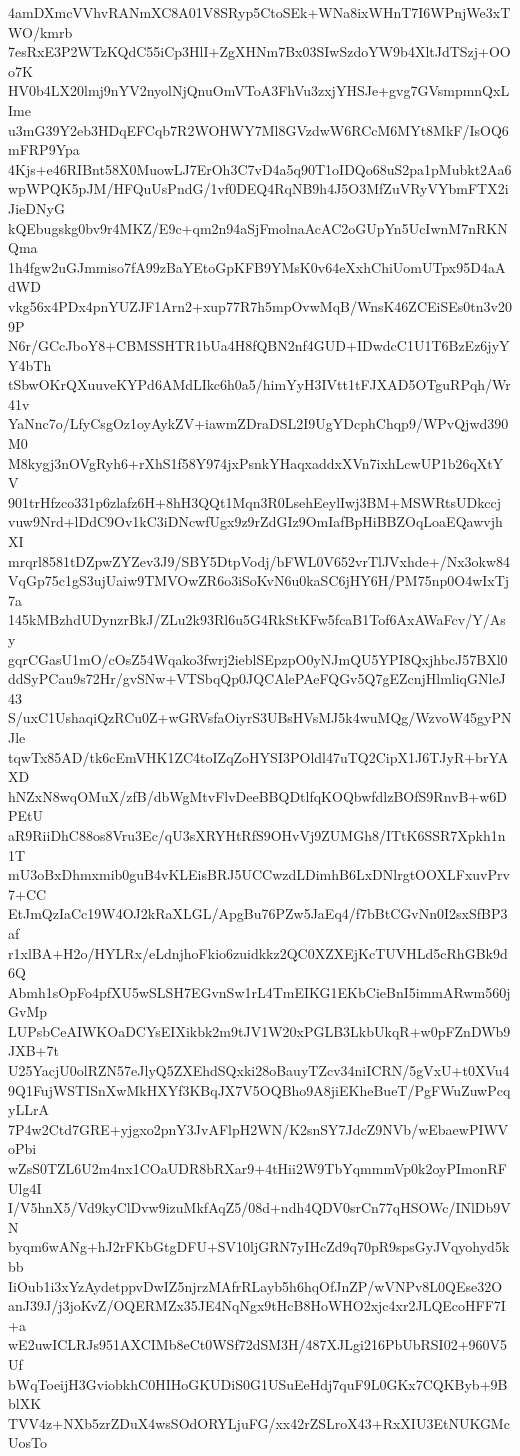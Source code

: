 4amDXmcVVhvRANmXC8A01V8SRyp5CtoSEk+WNa8ixWHnT7I6WPnjWe3xTWO/kmrb
7esRxE3P2WTzKQdC55iCp3HlI+ZgXHNm7Bx03SIwSzdoYW9b4XltJdTSzj+OOo7K
HV0b4LX20lmj9nYV2nyolNjQnuOmVToA3FhVu3zxjYHSJe+gvg7GVsmpmnQxLIme
u3mG39Y2eb3HDqEFCqb7R2WOHWY7Ml8GVzdwW6RCcM6MYt8MkF/IsOQ6mFRP9Ypa
4Kjs+e46RIBnt58X0MuowLJ7ErOh3C7vD4a5q90T1oIDQo68uS2pa1pMubkt2Aa6
wpWPQK5pJM/HFQuUsPndG/1vf0DEQ4RqNB9h4J5O3MfZuVRyVYbmFTX2iJieDNyG
kQEbugskg0bv9r4MKZ/E9c+qm2n94aSjFmolnaAcAC2oGUpYn5UcIwnM7nRKNQma
1h4fgw2uGJmmiso7fA99zBaYEtoGpKFB9YMsK0v64eXxhChiUomUTpx95D4aAdWD
vkg56x4PDx4pnYUZJF1Arn2+xup77R7h5mpOvwMqB/WnsK46ZCEiSEs0tn3v209P
N6r/GCcJboY8+CBMSSHTR1bUa4H8fQBN2nf4GUD+IDwdcC1U1T6BzEz6jyYY4bTh
tSbwOKrQXuuveKYPd6AMdLIkc6h0a5/himYyH3IVtt1tFJXAD5OTguRPqh/Wr41v
YaNnc7o/LfyCsgOz1oyAykZV+iawmZDraDSL2I9UgYDcphChqp9/WPvQjwd390M0
M8kygj3nOVgRyh6+rXhS1f58Y974jxPsnkYHaqxaddxXVn7ixhLcwUP1b26qXtYV
901trHfzco331p6zlafz6H+8hH3QQt1Mqn3R0LsehEeylIwj3BM+MSWRtsUDkccj
vuw9Nrd+lDdC9Ov1kC3iDNcwfUgx9z9rZdGIz9OmIafBpHiBBZOqLoaEQawvjhXI
mrqrl8581tDZpwZYZev3J9/SBY5DtpVodj/bFWL0V652vrTlJVxhde+/Nx3okw84
VqGp75c1gS3ujUaiw9TMVOwZR6o3iSoKvN6u0kaSC6jHY6H/PM75np0O4wIxTj7a
145kMBzhdUDynzrBkJ/ZLu2k93Rl6u5G4RkStKFw5fcaB1Tof6AxAWaFcv/Y/Asy
gqrCGasU1mO/cOsZ54Wqako3fwrj2ieblSEpzpO0yNJmQU5YPI8QxjhbcJ57BXl0
ddSyPCau9s72Hr/gvSNw+VTSbqQp0JQCAlePAeFQGv5Q7gEZcnjHlmliqGNleJ43
S/uxC1UshaqiQzRCu0Z+wGRVsfaOiyrS3UBsHVsMJ5k4wuMQg/WzvoW45gyPNJle
tqwTx85AD/tk6cEmVHK1ZC4toIZqZoHYSI3POldl47uTQ2CipX1J6TJyR+brYAXD
hNZxN8wqOMuX/zfB/dbWgMtvFlvDeeBBQDtlfqKOQbwfdlzBOfS9RnvB+w6DPEtU
aR9RiiDhC88os8Vru3Ec/qU3sXRYHtRfS9OHvVj9ZUMGh8/ITtK6SSR7Xpkh1n1T
mU3oBxDhmxmib0guB4vKLEisBRJ5UCCwzdLDimhB6LxDNlrgtOOXLFxuvPrv7+CC
EtJmQzIaCc19W4OJ2kRaXLGL/ApgBu76PZw5JaEq4/f7bBtCGvNn0I2sxSfBP3af
r1xlBA+H2o/HYLRx/eLdnjhoFkio6zuidkkz2QC0XZXEjKcTUVHLd5cRhGBk9d6Q
Abmh1sOpFo4pfXU5wSLSH7EGvnSw1rL4TmEIKG1EKbCieBnI5immARwm560jGvMp
LUPsbCeAIWKOaDCYsEIXikbk2m9tJV1W20xPGLB3LkbUkqR+w0pFZnDWb9JXB+7t
U25YacjU0olRZN57eJlyQ5ZXEhdSQxki28oBauyTZcv34niICRN/5gVxU+t0XVu4
9Q1FujWSTISnXwMkHXYf3KBqJX7V5OQBho9A8jiEKheBueT/PgFWuZuwPcqyLLrA
7P4w2Ctd7GRE+yjgxo2pnY3JvAFlpH2WN/K2snSY7JdcZ9NVb/wEbaewPIWVoPbi
wZsS0TZL6U2m4nx1COaUDR8bRXar9+4tHii2W9TbYqmmmVp0k2oyPImonRFUlg4I
I/V5hnX5/Vd9kyClDvw9izuMkfAqZ5/08d+ndh4QDV0srCn77qHSOWc/INlDb9VN
byqm6wANg+hJ2rFKbGtgDFU+SV10ljGRN7yIHcZd9q70pR9spsGyJVqyohyd5kbb
IiOub1i3xYzAydetppvDwIZ5njrzMAfrRLayb5h6hqOfJnZP/wVNPv8L0QEse32O
anJ39J/j3joKvZ/OQERMZx35JE4NqNgx9tHcB8HoWHO2xjc4xr2JLQEcoHFF7I+a
wE2uwICLRJs951AXCIMb8eCt0WSf72dSM3H/487XJLgi216PbUbRSI02+960V5Uf
bWqToeijH3GviobkhC0HIHoGKUDiS0G1USuEeHdj7quF9L0GKx7CQKByb+9BblXK
TVV4z+NXb5zrZDuX4wsSOdORYLjuFG/xx42rZSLroX43+RxXIU3EtNUKGMcUosTo
